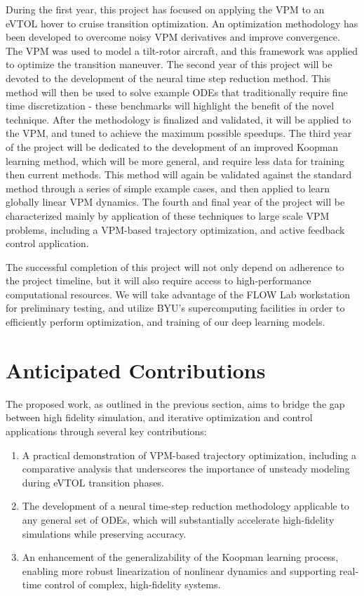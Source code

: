 \documentclass[12pt, letterpaper]{article}
\begin{document}
During the first year, this project has focused on applying the VPM to an eVTOL hover to cruise transition optimization.  An optimization methodology has been developed to overcome noisy VPM derivatives and improve convergence.  The VPM was used to model a tilt-rotor aircraft, and this framework was applied to optimize the transition maneuver.  The second year of this project will be devoted to the development of the neural time step reduction method.  This method will then be used to solve example ODEs that traditionally require fine time discretization - these benchmarks will highlight the benefit of the novel technique.  After the methodology is finalized and validated, it will be applied to the VPM, and tuned to achieve the maximum possible speedups.  The third year of the project will be dedicated to the development of an improved Koopman learning method, which will be more general, and require less data for training then current methods.  This method will again be validated against the standard method through a series of simple example cases, and then applied to learn globally linear VPM dynamics.  The fourth and final year of the project will be characterized mainly by application of these techniques to large scale VPM problems, including a VPM-based trajectory optimization, and active feedback control application.

The successful completion of this project will not only depend on adherence to the project timeline, but it will also require access to high-performance computational resources.  We will take advantage of the FLOW Lab workstation for preliminary testing, and utilize BYU's supercomputing facilities in order to efficiently perform optimization, and training of our deep learning models. 

\section{Anticipated Contributions}


The proposed work, as outlined in the previous section, aims to bridge the gap between high fidelity simulation, and iterative optimization and control applications through several key contributions:

\begin{enumerate}
\item A practical demonstration of VPM-based trajectory optimization, including a comparative analysis that underscores the importance of unsteady modeling during eVTOL transition phases.
\item The development of a neural time-step reduction methodology applicable to any general set of ODEs, which will substantially accelerate high-fidelity simulations while preserving accuracy.
\item An enhancement of the generalizability of the Koopman learning process, enabling more robust linearization of nonlinear dynamics and supporting real-time control of complex, high-fidelity systems.
\end{enumerate}
\end{document}

